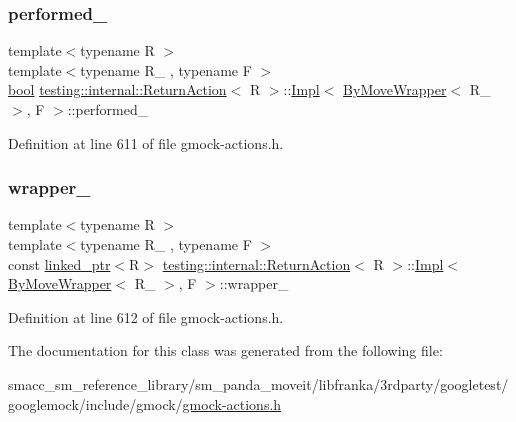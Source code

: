 \subsubsection{\texorpdfstring{performed\+\_\+}{performed\_}}
{\footnotesize\ttfamily template$<$typename R $>$ \\
template$<$typename R\+\_\+ , typename F $>$ \\
\hyperlink{classbool}{bool} \hyperlink{classtesting_1_1internal_1_1ReturnAction}{testing\+::internal\+::\+Return\+Action}$<$ R $>$\+::\hyperlink{classtesting_1_1internal_1_1ReturnAction_1_1Impl}{Impl}$<$ \hyperlink{structtesting_1_1internal_1_1ByMoveWrapper}{By\+Move\+Wrapper}$<$ R\+\_\+ $>$, F $>$\+::performed\+\_\+\hspace{0.3cm}{\ttfamily [private]}}



Definition at line 611 of file gmock-\/actions.\+h.

\mbox{\label{classtesting_1_1internal_1_1ReturnAction_1_1Impl_3_01ByMoveWrapper_3_01R___01_4_00_01F_01_4_a8ff130e32f8b90238cdbf7d62fe99de1}} 
\subsubsection{\texorpdfstring{wrapper\+\_\+}{wrapper\_}}
{\footnotesize\ttfamily template$<$typename R $>$ \\
template$<$typename R\+\_\+ , typename F $>$ \\
const \hyperlink{classtesting_1_1internal_1_1linked__ptr}{linked\+\_\+ptr}$<$R$>$ \hyperlink{classtesting_1_1internal_1_1ReturnAction}{testing\+::internal\+::\+Return\+Action}$<$ R $>$\+::\hyperlink{classtesting_1_1internal_1_1ReturnAction_1_1Impl}{Impl}$<$ \hyperlink{structtesting_1_1internal_1_1ByMoveWrapper}{By\+Move\+Wrapper}$<$ R\+\_\+ $>$, F $>$\+::wrapper\+\_\+\hspace{0.3cm}{\ttfamily [private]}}



Definition at line 612 of file gmock-\/actions.\+h.



The documentation for this class was generated from the following file\+:\begin{DoxyCompactItemize}
\item 
smacc\+\_\+sm\+\_\+reference\+\_\+library/sm\+\_\+panda\+\_\+moveit/libfranka/3rdparty/googletest/googlemock/include/gmock/\hyperlink{gmock-actions_8h}{gmock-\/actions.\+h}\end{DoxyCompactItemize}
